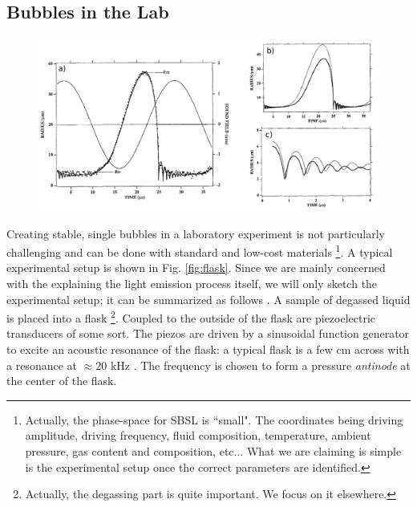 \documentclass[prb,aps,nofootinbib,superscriptaddress,floatfix]{revtex4-2}
\begin{document}
\subsection{Bubbles in the Lab}
\begin{figure}
\includegraphics[width=0.9\linewidth]{figs/bubble_radius_1.pdf}
    \caption{\cite{barber1997defining,barber1992light}}
\label{fig:bubble_radius_1}
\end{figure}

Creating stable, single bubbles in a laboratory experiment is not particularly challenging and can be done with standard and low-cost materials \footnote{Actually, the phase-space for SBSL is ``small". The coordinates being driving amplitude, driving frequency, fluid composition, temperature, ambient pressure, gas content and composition, etc... What we are claiming is simple is the experimental setup once the correct parameters are identified.}. A typical experimental setup is shown in Fig. \ref{fig:flask}. Since we are mainly concerned with the explaining the light emission process itself, we will only sketch the experimental setup; it can be summarized as follows \cite{lentz1995mie,gaitan1990experimental,gaitan1992sonoluminescence,gompf2000mie,brenner2002single,yasui2018acoustic,brennen2014cavitation,suslick2008inside}. A sample of degassed liquid is placed into a flask \footnote{Actually, the degassing part is quite important. We focus on it elsewhere.}. Coupled to the outside of the flask are piezoelectric transducers of some sort. The piezos are driven by a sinusoidal function generator to excite an acoustic resonance of the flask: a typical flask is a few cm across with a resonance at $\approx 20$ kHz \cite{brenner2002single}. The frequency is chosen to form a pressure \emph{antinode} at the center of the flask.
\end{document}
